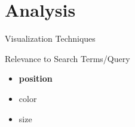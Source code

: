 \documentclass{beamer}
\begin{document}
\section{Analysis}
\begin{frame}{Visualization Techniques}
	\begin{beamerboxesrounded}[shadow=true]{Relevance to Search Terms/Query}
		\begin{itemize}
			\item \textbf{position} \cite{Einsfeld2006, Google2009, Konchady1998, Nowell1996}
			\item color \cite{Hoeber2006, Mukherjea1999, Nowell1996}
			\item size \cite{Mukherjea1996, Paulovich2008}
		\end{itemize}
		\begin{figure}[htbp]
			\begin{center}
			\end{center}
		\end{figure}
	\end{beamerboxesrounded}
\end{frame}
\end{document}
